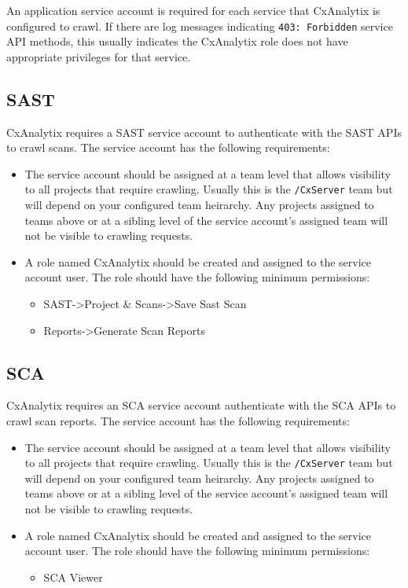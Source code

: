 An application service account is required for each service that CxAnalytix is configured to crawl.  If there are log messages indicating 
\verb|403: Forbidden| service API methods, this usually indicates the CxAnalytix role does not have appropriate privileges for that service.


\subsection{SAST}
CxAnalytix requires a SAST service account to authenticate with the SAST APIs to crawl scans. The service account has the following requirements:

\begin{itemize}
    \item The service account should be assigned at a team level that allows visibility to all projects that require crawling. 
    Usually this is the \verb|/CxServer|
    team but will depend on your configured team heirarchy. Any projects assigned to teams above or at a sibling level of the service account's assigned team 
    will not be visible to crawling requests.

    \item A role named CxAnalytix should be created and assigned to the service account user. The role should have the following minimum permissions:
    \begin{itemize}
        \item SAST->Project \& Scans->Save Sast Scan
        \item Reports->Generate Scan Reports
    \end{itemize}

\end{itemize}

\subsection{SCA}

CxAnalytix requires an SCA service account authenticate with the SCA APIs to crawl scan reports. The service account has the following requirements:

\begin{itemize}
    \item The service account should be assigned at a team level that allows visibility to all projects that require crawling. 
    Usually this is the \verb|/CxServer|
    team but will depend on your configured team heirarchy. Any projects assigned to teams above or at a sibling level of the service account's assigned team 
    will not be visible to crawling requests.

    \item A role named CxAnalytix should be created and assigned to the service account user. The role should have the following minimum permissions:
    \begin{itemize}
        \item SCA Viewer
    \end{itemize}

\end{itemize}

